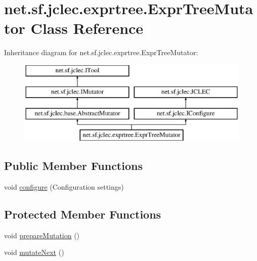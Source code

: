 \hypertarget{classnet_1_1sf_1_1jclec_1_1exprtree_1_1_expr_tree_mutator}{\section{net.\-sf.\-jclec.\-exprtree.\-Expr\-Tree\-Mutator Class Reference}
\label{classnet_1_1sf_1_1jclec_1_1exprtree_1_1_expr_tree_mutator}
}
Inheritance diagram for net.\-sf.\-jclec.\-exprtree.\-Expr\-Tree\-Mutator\-:\begin{figure}[H]
\begin{center}
\leavevmode
\includegraphics[height=4.000000cm]{classnet_1_1sf_1_1jclec_1_1exprtree_1_1_expr_tree_mutator}
\end{center}
\end{figure}
\subsection*{Public Member Functions}
\begin{DoxyCompactItemize}
\item 
void \hyperlink{classnet_1_1sf_1_1jclec_1_1exprtree_1_1_expr_tree_mutator_ae0c1d1db6bce702193c621c3b9366688}{configure} (Configuration settings)
\end{DoxyCompactItemize}
\subsection*{Protected Member Functions}
\begin{DoxyCompactItemize}
\item 
void \hyperlink{classnet_1_1sf_1_1jclec_1_1exprtree_1_1_expr_tree_mutator_a2bafce5d54003041106517857e0ce65b}{prepare\-Mutation} ()
\item 
void \hyperlink{classnet_1_1sf_1_1jclec_1_1exprtree_1_1_expr_tree_mutator_a51f55d91527bfbd7656f6cd11c4ebb3d}{mutate\-Next} ()
\end{DoxyCompactItemize}
